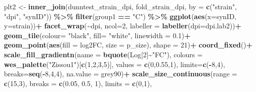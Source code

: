 \documentclass[
]{article}
\newenvironment{Shaded}{\begin{snugshade}}{\end{snugshade}}
\newcommand{\AttributeTok}[1]{\textcolor[rgb]{0.13,0.29,0.53}{#1}}
\newcommand{\DecValTok}[1]{\textcolor[rgb]{0.00,0.00,0.81}{#1}}
\newcommand{\FloatTok}[1]{\textcolor[rgb]{0.00,0.00,0.81}{#1}}
\newcommand{\FunctionTok}[1]{\textcolor[rgb]{0.13,0.29,0.53}{\textbf{#1}}}
\newcommand{\NormalTok}[1]{#1}
\newcommand{\OtherTok}[1]{\textcolor[rgb]{0.56,0.35,0.01}{#1}}
\newcommand{\SpecialCharTok}[1]{\textcolor[rgb]{0.81,0.36,0.00}{\textbf{#1}}}
\newcommand{\StringTok}[1]{\textcolor[rgb]{0.31,0.60,0.02}{#1}}
\begin{document}
\begin{Shaded}
\begin{Highlighting}[]
\NormalTok{plt2 }\OtherTok{\textless{}{-}} \FunctionTok{inner\_join}\NormalTok{(dunntest\_strain\_dpi, fold\_strain\_dpi, }\AttributeTok{by =} \FunctionTok{c}\NormalTok{(}\StringTok{"strain"}\NormalTok{, }\StringTok{"dpi"}\NormalTok{, }\StringTok{"synID"}\NormalTok{)) }\SpecialCharTok{\%\textgreater{}\%} 
    \FunctionTok{filter}\NormalTok{(group1 }\SpecialCharTok{==} \StringTok{"C"}\NormalTok{) }\SpecialCharTok{\%\textgreater{}\%} 
    \FunctionTok{ggplot}\NormalTok{(}\FunctionTok{aes}\NormalTok{(}\AttributeTok{x=}\NormalTok{synID, }\AttributeTok{y=}\NormalTok{strain))}\SpecialCharTok{+}
    \FunctionTok{facet\_wrap}\NormalTok{(}\SpecialCharTok{\textasciitilde{}}\NormalTok{dpi, }\AttributeTok{ncol=}\DecValTok{2}\NormalTok{, }\AttributeTok{labeller =} \FunctionTok{labeller}\NormalTok{(}\AttributeTok{dpi=}\NormalTok{dpi.lab2))}\SpecialCharTok{+}
    \FunctionTok{geom\_tile}\NormalTok{(}\AttributeTok{colour=} \StringTok{"black"}\NormalTok{, }\AttributeTok{fill=} \StringTok{"white"}\NormalTok{, }\AttributeTok{linewidth =} \FloatTok{0.1}\NormalTok{)}\SpecialCharTok{+}
    \FunctionTok{geom\_point}\NormalTok{(}\FunctionTok{aes}\NormalTok{(}\AttributeTok{fill =}\NormalTok{ log2FC, }\AttributeTok{size =}\NormalTok{ p\_size), }\AttributeTok{shape =} \DecValTok{21}\NormalTok{)}\SpecialCharTok{+}
    \FunctionTok{coord\_fixed}\NormalTok{()}\SpecialCharTok{+}
    \FunctionTok{scale\_fill\_gradientn}\NormalTok{(}\AttributeTok{name =} \FunctionTok{bquote}\NormalTok{(Log[}\DecValTok{2}\NormalTok{]}\SpecialCharTok{\textasciitilde{}}\StringTok{"FC"}\NormalTok{), }\AttributeTok{colours =} \FunctionTok{wes\_palette}\NormalTok{(}\StringTok{"Zissou1"}\NormalTok{)[}\FunctionTok{c}\NormalTok{(}\DecValTok{1}\NormalTok{,}\DecValTok{2}\NormalTok{,}\DecValTok{3}\NormalTok{,}\DecValTok{5}\NormalTok{)], }
                         \AttributeTok{values =} \FunctionTok{c}\NormalTok{(}\DecValTok{0}\NormalTok{,}\FloatTok{0.55}\NormalTok{,}\DecValTok{1}\NormalTok{), }\AttributeTok{limits=}\FunctionTok{c}\NormalTok{(}\SpecialCharTok{{-}}\DecValTok{8}\NormalTok{,}\DecValTok{4}\NormalTok{), }\AttributeTok{breaks=}\FunctionTok{seq}\NormalTok{(}\SpecialCharTok{{-}}\DecValTok{8}\NormalTok{,}\DecValTok{4}\NormalTok{,}\DecValTok{4}\NormalTok{), }\AttributeTok{na.value =} \StringTok{\textquotesingle{}grey90\textquotesingle{}}\NormalTok{)}\SpecialCharTok{+}
    \FunctionTok{scale\_size\_continuous}\NormalTok{(}\AttributeTok{range =} \FunctionTok{c}\NormalTok{(}\DecValTok{15}\NormalTok{,}\DecValTok{3}\NormalTok{), }\AttributeTok{breaks =} \FunctionTok{c}\NormalTok{(}\FloatTok{0.05}\NormalTok{, }\FloatTok{0.5}\NormalTok{, }\DecValTok{1}\NormalTok{), }\AttributeTok{limits =} \FunctionTok{c}\NormalTok{(}\DecValTok{0}\NormalTok{,}\DecValTok{1}\NormalTok{),}

\end{Highlighting}
\end{Shaded}
\end{document}
